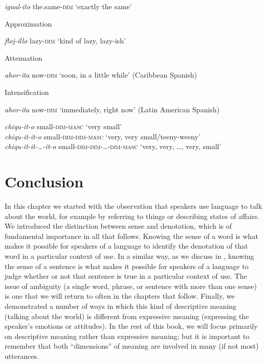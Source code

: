 \textit{igual-ito}  the.same-\textsc{dim}  ‘exactly the same’

\ex Approximation

\textit{floj-illo}  lazy-\textsc{dim}  ‘kind of lazy, lazy-ish’

\ex Attenuation

\textit{ahor-ita}  now-\textsc{dim}  ‘soon, in a little while’ (Caribbean Spanish)

\ex Intensification

\textit{ahor-ita}  now-\textsc{dim}  ‘immediately, right now’ (Latin American Spanish)

\textit{chiqu-it-o}  small-\textsc{dim-masc}  ‘very small’\\
\textit{chiqu-it-it-o}  small-\textsc{dim-dim-masc}  ‘very, very small/teeny-weeny’\\
\textit{chiqu-it-it-…-it-o}  small-\textsc{dim}-\textsc{dim}-\textsc{…}-\textsc{dim}-\textsc{masc} ‘very, very, …, very, small’
\z
\z
\section{Conclusion}\label{sec:} %

In this chapter we started with the observation that speakers use language to talk about the world, for example by referring to things or describing states of affairs. We introduced the distinction between sense and denotation, which is of fundamental importance in all that follows. Knowing the sense of a word is what makes it possible for speakers of a language to identify the denotation of that word in a particular context of use. In a similar way, as we discuss in , knowing the sense of a sentence is what makes it possible for speakers of a language to judge whether or not that sentence is true in a particular context of use. The issue of ambiguity (a single word, phrase, or sentence with more than one sense) is one that we will return to often in the chapters that follow. Finally, we demonstrated a number of ways in which this kind of descriptive meaning (talking about the world) is different from expressive meaning (expressing the speaker’s emotions or attitudes). In the rest of this book, we will focus primarily on descriptive meaning rather than expressive meaning; but it is important to remember that both “dimensions” of meaning are involved in many (if not most) utterances.



\furtherreading



